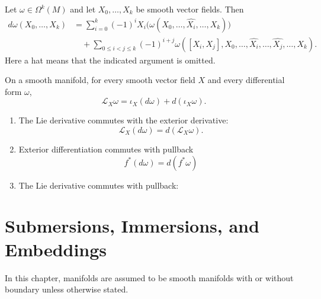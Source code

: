\documentclass[12pt, oneside]{book}
\begin{document}
\begin{proposition}
    Let $\omega\in\Omega^k(M)$ and let $X_0,\ldots,X_k$ be smooth vector fields. Then
    \begin{align*}
        d\omega(X_0,\ldots,X_k)
         & =
        \sum_{i=0}^k
        (-1)^i
        X_i\bigl(\omega(X_0,\ldots,\widehat{X_i},\ldots,X_k)\bigr) \\
         & \quad+
        \sum_{0\leq i<j\leq k}
        (-1)^{i+j}
        \omega([X_i,X_j],X_0,\ldots,\widehat{X_i},\ldots,\widehat{X_j},\ldots,X_k).
    \end{align*}
    Here a hat means that the indicated argument is omitted.
\end{proposition}









\begin{theorem}
    On a smooth manifold, for every smooth vector field $X$ and every differential form $\omega$,
    \[
        \mathcal{L}_X\omega
        =
        \iota_X(d\omega)+d(\iota_X\omega).
    \]
\end{theorem}

\begin{proposition}
    \begin{enumerate}
        \item
              The Lie derivative commutes with the exterior derivative:
              \[
                  \mathcal{L}_X(d\omega)=d(\mathcal{L}_X\omega).
              \]
        \item
              Exterior differentiation commutes with pullback
              \[
                  f^*(d\omega)=d(f^*\omega)
              \]
        \item The Lie derivative commutes with pullback:
    \end{enumerate}

\end{proposition}



















\chapter{Submersions, Immersions, and Embeddings}
In this chapter, manifolds are assumed to be smooth manifolds with or without boundary unless otherwise stated.
\end{document}

